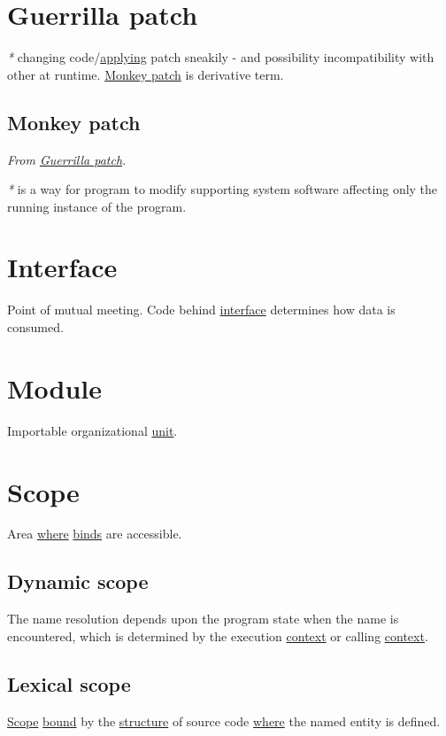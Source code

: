 \documentclass[a4paper,14pt,oneside]{book}
\begin{document}
\section{\label{org27e6548}Guerrilla patch}
\label{sec:org332440e}
\emph{*} changing code/\hyperref[org840fdc7]{applying} patch sneakily - and possibility incompatibility with other at runtime.
\hyperref[orgee834d9]{Monkey patch} is derivative term.

\subsection{\label{orgee834d9}Monkey patch}
\label{sec:orgf844798}
\emph{From \hyperref[org27e6548]{Guerrilla patch}.}

\emph{*} is a way for program to modify supporting system software affecting only the running instance of the program.

\section{\label{org7982355}Interface}
\label{sec:org7101d8c}
Point of mutual meeting. Code behind \hyperref[org7982355]{interface} determines how data is consumed.

\section{\label{orgb297e81}Module}
\label{sec:org0a0a03c}
Importable organizational \hyperref[org32dda57]{unit}.

\section{\label{org8dd0b03}Scope}
\label{sec:org4cf4e45}
Area \hyperref[org3993fb7]{where} \hyperref[org757a68d]{binds} are accessible.

\subsection{\label{org117d62e}Dynamic scope}
\label{sec:org3e158c0}
The name resolution depends upon the program state when the name is encountered, which is determined by the execution \hyperref[org1aa5f88]{context} or calling \hyperref[org1aa5f88]{context}.

\subsection{\label{org30cf8d1}Lexical scope}
\label{sec:orgaf579b9}
\hyperref[org8dd0b03]{Scope} \hyperref[orgbc9015c]{bound} by the \hyperref[org97cc880]{structure} of source code \hyperref[org3993fb7]{where} the named entity is defined.
\end{document}
